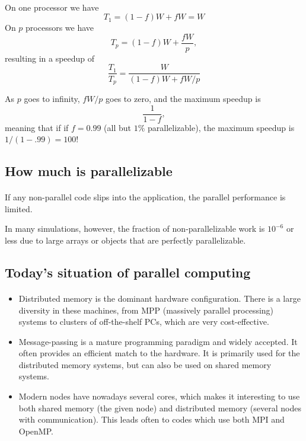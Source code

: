 \documentclass[%
oneside,                 %
final,                   %
10pt]{article}
\begin{document}
\paragraph{}
On one processor we have 
\[
T_1 = (1-f)W + fW = W
\]
On $p$ processors we have
\[
T_p = (1-f)W + \frac{fW}{p},
\]
resulting in a speedup of 
\[
\frac{T_1}{T_p} = \frac{W}{(1-f)W+fW/p}
\]

As $p$ goes to infinity, $fW/p$ goes to zero, and the maximum speedup is
\[
\frac{1}{1-f},
\]
meaning that if 
if $f = 0.99$ (all but $1\%$ parallelizable), the maximum speedup
is $1/(1-.99)=100$!



\subsection*{How much is parallelizable}

\paragraph{}
If any non-parallel code slips into the
application, the parallel
performance is limited. 

In many simulations, however, the fraction of non-parallelizable work
is $10^{-6}$ or less due to large arrays or objects that are perfectly parallelizable.



\subsection*{Today's situation of parallel computing}

\paragraph{}

\begin{itemize}
\item Distributed memory is the dominant hardware configuration. There is a large diversity in these machines, from  MPP (massively parallel processing) systems to clusters of off-the-shelf PCs, which are very cost-effective.

\item Message-passing is a mature programming paradigm and widely accepted. It often provides an efficient match to the hardware. It is primarily used for the distributed memory systems, but can also be used on shared memory systems.

\item Modern nodes have nowadays several cores, which makes it interesting to use both shared memory (the given node) and distributed memory (several nodes with communication). This leads often to codes which use both MPI and OpenMP.
\end{itemize}
\end{document}
